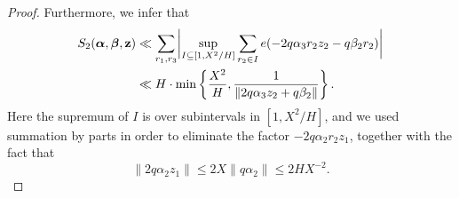\documentclass{amsart}%
\numberwithin{equation}{section}
\theoremstyle{remark}
\newcommand{\bz}{{\bf z}}
\newcommand{\1}{\mathbbm{1}}
\newcommand{\balp}{\boldsymbol{\alpha}}
\newcommand{\bbet}{\boldsymbol{\beta}}
\begin{document}
\begin{proof}
Furthermore, we infer that 
\begin{equation}\label{S2bd2}
    \begin{aligned}
S_2(\balp, \bbet, \bz) &\ll \sum_{r_1,r_3}\biggl|\sup_{I\subseteq \left[1,X^{2}/H\right]}\sum_{r_2\in I}e(-2q\alpha_3r_2z_2-q\beta_2r_2)\biggr| \\
&\ll H \cdot \min\left\{\frac{X^{2}}{H},\frac{1}{\|2q\alpha_3z_2+q\beta_2\|}\right\}.
\end{aligned}
\end{equation}
Here the supremum of $I$ is over subintervals in $\left[1,X^2/H\right]$, and we used summation by parts in order to eliminate the factor $-2q\alpha_2r_2z_1$, together with the fact that
\begin{equation*}
    \|2q\alpha_2z_1\|\leq 2X\|q\alpha_2\|\leq 2HX^{-2}.
\end{equation*}


\end{proof}
\end{document}
